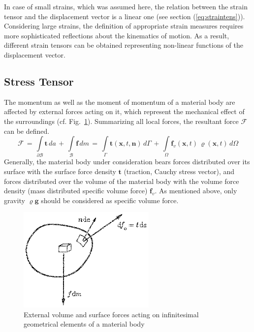 In case of small strains, which was assumed here, the relation between the strain tensor and the displacement vector is a linear one (see section (\ref{eq:straintens})). Considering large strains, the definition of appropriate strain measures requires more sophisticated reflections about the kinematics of motion. As a result, different strain tensors can be obtained representing non-linear functions of the displacement vector. 

\subsection{Stress Tensor}
\label{sec:stresstensor}

The momentum as well as the moment of momentum of a material body are affected by external forces acting on it, which represent the mechanical effect of the surroundings (cf. Fig.~\ref{fig:ext_forces}). Summarizing all local forces, the resultant force $\mathcal{F}$ can be defined.
\begin{equation}
\mathcal{F}\,=\,
\int\limits_{\partial\mathcal{B}}\mathbf{t}\,da\,+\,\int\limits_{\mathcal{B}}\mathbf{f}\,dm\,=\,
\int\limits_{\Gamma}\mathbf{t}(\mathbf{x},t,\mathbf{n})\,d\Gamma\,+\,
\int\limits_{\Omega}\mathbf{f}_v(\mathbf{x},t)\,\varrho(\mathbf{x},t)\,d\Omega
\label{eq:result_force}
\end{equation}
Generally, the material body under consideration bears forces distributed over its surface with the surface force
density $\mathbf{t}$ (traction, Cauchy stress vector), and forces distributed over the volume of the material body with the volume force density (mass distributed specific volume force) $\mathbf{f}_v$. As mentioned above, only gravity $\varrho\mathbf{g}$ should be considered as specific volume force.

\begin{figure}[htb!]
\begin{center}
\footnotesize
\includegraphics[width=0.6\textwidth]{figures/ext_forces.eps}
\caption{External volume and surface forces acting on infinitesimal geometrical elements of a material body \cite{Haupt:2002}}
\label{fig:ext_forces}
\end{center}
\end{figure}

